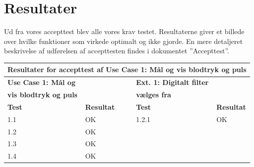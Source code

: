 \section{Resultater}

Ud fra vores accepttest blev alle vores krav testet. Resultaterne giver et billede over hvilke funktioner som virkede optimalt og ikke gjorde. En mere detaljeret beskrivelse af udførelsen af accepttesten findes i dokumentet ”Accepttest”.

\begin{table}[h!]
	\centering
	\begin{tabular}{llllll}
		\multicolumn{6}{l}{\cellcolor[HTML]{187ABD}\textbf{Resultater for accepttest af Use Case 1: Mål og vis blodtryk og puls}} \\ \hline
		\textbf{Use Case 1: Mål og} & \multicolumn{1}{l|}{} &  & \multicolumn{1}{l|}{} & \textbf{Ext. 1: Digitalt filter} &  \\
		\textbf{vis blodtryk og puls} & \multicolumn{1}{l|}{} &  & \multicolumn{1}{l|}{} & \textbf{vælges fra} &  \\ \cline{1-2} \cline{5-6} 
		\textbf{Test} & \multicolumn{1}{l|}{\textbf{Resultat}} &  & \multicolumn{1}{l|}{} & \textbf{Test} & \textbf{Resultat} \\ \cline{1-2} \cline{5-6} 
		1.1 & \multicolumn{1}{l|}{OK} &  & \multicolumn{1}{l|}{} & 1.2.1 & OK \\ \cline{1-2} \cline{5-6} 
		1.2 & \multicolumn{1}{l|}{OK} &  & \multicolumn{1}{l|}{} &  &  \\ \cline{1-2} \cline{5-6} 
		1.3 & \multicolumn{1}{l|}{OK} &  & \multicolumn{1}{l|}{} &  &  \\ \cline{1-2} \cline{5-6} 
		1.4 & \multicolumn{1}{l|}{OK} &  & \multicolumn{1}{l|}{} &  & 
	\end{tabular}
\end{table}

